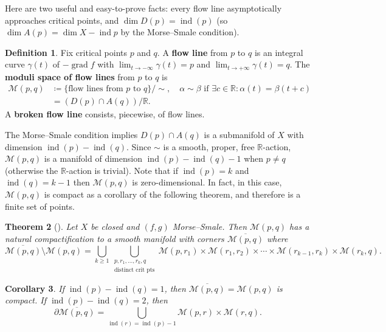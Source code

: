 \documentclass{report}
\theoremstyle{plain}
\newtheorem{theorem}{Theorem}[section]
\newtheorem{corollary}[theorem]{Corollary}
\theoremstyle{definition}
\newtheorem{definition}[theorem]{Definition}
\theoremstyle{remark}
\newcommand{\di}{\partial}
\newcommand{\bR}{\mathbb{R}}
\newcommand{\cM}{\mathcal{M}}
\DeclareMathOperator{\grad}{grad}
\DeclareMathOperator{\ind}{ind}
\begin{document}
Here are two useful and easy-to-prove facts: every flow line
asymptotically approaches critical points, and $\dim D(p) = \ind(p)$
(so $\dim A(p) = \dim X - \ind p$ by the Morse--Smale condition).

\begin{definition} \label{def:morse-theory-flow-line}
  Fix critical points $p$ and $q$. A {\bf flow line} from $p$ to $q$
  is an integral curve $\gamma(t)$ of $-\grad f$ with $\lim_{t \to
    -\infty} \gamma(t) = p$ and $\lim_{t \to +\infty} \gamma(t) = q$.
  The {\bf moduli space of flow lines} from $p$ to $q$ is
  \begin{align*}
    \cM(p, q) &\coloneqq \{\text{flow lines from } p \text{ to } q\}/\sim,
    \quad \alpha \sim \beta \text{ if } \exists c \in \bR : \alpha(t) = \beta(t + c) \\
    &= (D(p) \cap A(q)) / \bR.
  \end{align*}
  A {\bf broken flow line} consists, piecewise, of flow lines.
\end{definition}

The Morse--Smale condition implies $D(p) \cap A(q)$ is a submanifold
of $X$ with dimension $\ind(p) - \ind(q)$. Since $\sim$ is a smooth,
proper, free $\bR$-action, $\cM(p, q)$ is a manifold of dimension
$\ind(p) - \ind(q) - 1$ when $p \neq q$ (otherwise the $\bR$-action is
trivial). Note that if $\ind(p) = k$ and $\ind(q) = k-1$ then $\cM(p,
q)$ is zero-dimensional. In fact, in this case, $\cM(p, q)$ is compact
as a corollary of the following theorem, and therefore is a finite set
of points.

\begin{theorem}[{\cite[Theorem 2.1]{Hutchings2012}}]
  Let $X$ be closed and $(f, g)$ Morse--Smale. Then $\cM(p, q)$ has a
  natural compactification to a smooth manifold with corners
  $\overline{\cM(p, q)}$ where
  \[ \overline{\cM(p, q)} \setminus \cM(p, q) = \bigcup_{k \ge 1} \bigcup_{\substack{p,r_1,\ldots,r_k,q\\\text{distinct crit pts}}} \cM(p, r_1) \times \cM(r_1, r_2) \times \cdots \times \cM(r_{k-1}, r_k) \times \cM(r_k, q). \]
\end{theorem}

\begin{corollary}
  If $\ind(p) - \ind(q) = 1$, then $\overline{\cM(p, q)} = \cM(p, q)$
  is compact. If $\ind(p) - \ind(q) = 2$, then
  \[ \di \overline{\cM(p, q)} = \bigcup_{\ind(r) = \ind(p)-1} \cM(p, r) \times \cM(r, q). \]
\end{corollary}
\end{document}
